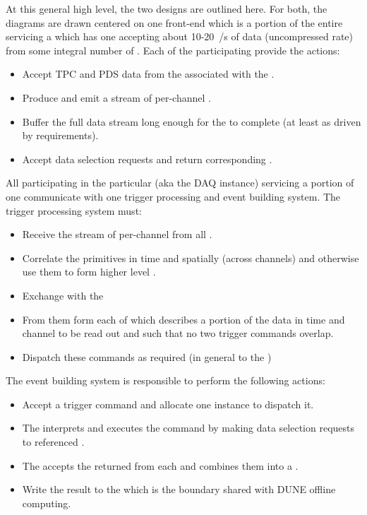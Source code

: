 At this general high level, the two designs are outlined here. 
For both, the diagrams are drawn centered on one 
front-end which is a portion of the entire  servicing a
 which has one  accepting about
10-20~\si{\Gbps/\s} of data (uncompressed rate) from some integral
number of . 
Each of the participating  provide the actions:
\begin{itemize}
\item Accept TPC and PDS data from the  associated with the .
\item Produce and emit a stream of per-channel .
\item Buffer the full data stream long enough for the  to complete (at least \snbpretime as driven by  requirements).
\item Accept data selection requests and return corresponding .
\end{itemize}

All participating  in the particular 
(aka the DAQ instance) servicing a portion of one 
communicate with one trigger processing and event building system.
The trigger processing system must:
\begin{itemize}
\item Receive the stream of per-channel  from all .
\item Correlate the primitives in time and spatially (across channels) and otherwise use them to form higher level .
\item Exchange  with the 
\item From them form  each of which describes a
  portion of the data in time and channel to be read out and such that
  no two trigger commands overlap.
\item Dispatch these commands as required (in general to the )
\end{itemize}
The event building system is responsible to perform the following actions:
\begin{itemize}
\item Accept a trigger command and allocate one  instance to dispatch it.
\item The  interprets and executes the command by making
  data selection requests to referenced .
\item The  accepts the returned  from each
   and combines them into a .
\item Write the result to the  which is the boundary
  shared with DUNE offline computing.
\end{itemize}

